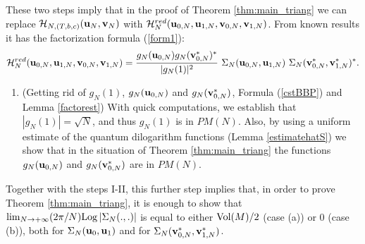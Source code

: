 \documentclass[11pt]{amsart}
\newcommand{\bu}{{\bf u}}
\newcommand{\bv}{{\bf v}}
\newcommand{\Log}{{\rm Log}}
\newcommand{\Hh}{{\mathcal H}}
\newcommand{\ra}{\rightarrow}
\begin{document}
These two steps imply that in the proof of Theorem \ref{thm:main_triang} we can replace $\Hh_{N,(T,b,c)}(\bu_N,\bv_N)$ with $\Hh_{N}^{red}(\bu_{0,N},\bu_{1,N},\bv_{0,N},\bv_{1,N})$. From known results it has the factorization formula (\ref{form1}):
$$\Hh_{N}^{red}(\bu_{0,N},\bu_{1,N},\bv_{0,N},\bv_{1,N})   = \frac{g_N(\bu_{0,N})g_N(\bv_{0,N}^*)^*}{|g_N(1)|^2}\ \Sigma_N(\bu_{0,N},\bu_{1,N})\ \Sigma_N(\bv_{0,N}^*,\bv_{1,N}^*)^*.$$
\medskip 

\begin{enumerate}
\item[III)] (Getting rid of $g_N(1)$, $g_N(\bu_{0,N})$ and $g_N(\bv_{0,N}^*)$, Formula (\ref{cstBBP}) and Lemma \ref{factorest}) With quick computations, we establish that $|g_N(1)|=\sqrt{N}$, and thus $g_N(1)$ is in $PM(N)$. Also, by using a uniform estimate of the quantum dilogarithm functions (Lemma \ref{estimatehatS}) we show that in the situation of Theorem \ref{thm:main_triang} the functions $g_N(\bu_{0,N})$ and $g_N(\bv_{0,N}^*)$ are in $PM(N)$.

\end{enumerate}
\medskip

Together with the steps I-II, this further step implies that, in order to prove Theorem \ref{thm:main_triang}, it is enough to show that $\textstyle \lim_{N\ra +\infty} (2\pi/N) \Log \left \vert \Sigma_N(.,.)\right \vert$ is equal to either ${\rm Vol}(M)/2$ (case (a)) or $0$ (case (b)), both for $\Sigma_N(\bu_0,\bu_1)$ and for $\Sigma_N(\bv_{0,N}^*,\bv_{1,N}^*)$. 
\medskip 
\end{document}
